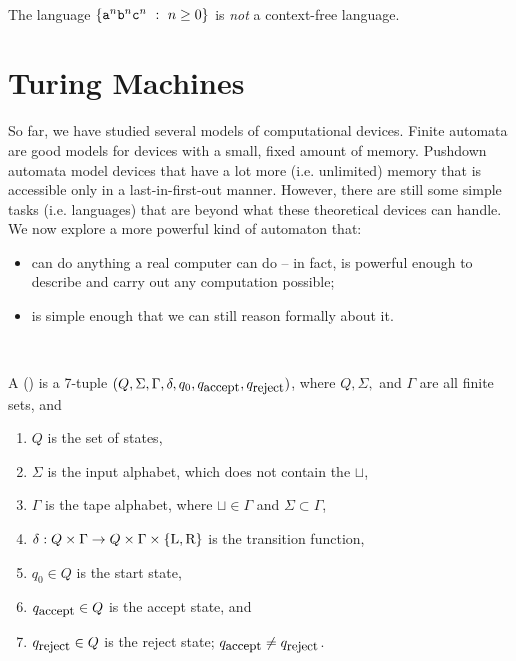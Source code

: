\documentclass[twoside,letterpaper,openany]{book}
\begin{document}
~

\begin{thm}
The language $\left\lbrace \texttt{a}^n \texttt{b}^n \texttt{c}^n\ :\  n \geq 0  \right\rbrace$ is \emph{not} a context-free language.
\end{thm}






\chapter{Turing Machines}

So far, we have studied several models of computational devices. Finite automata are good models for devices with a small, fixed amount of memory. Pushdown automata model devices that have a lot more (i.e. unlimited) memory that is accessible only in a last-in-first-out manner. However, there are still some simple tasks (i.e. languages) that are beyond what these theoretical devices can handle. We now explore a more powerful kind of automaton that:

\begin{itemize}
\item can do anything a real computer can do -- in fact, is powerful enough to describe and carry out any computation possible;
\item is simple enough that we can still reason formally about it.
\end{itemize}

~

\newcommand\qaccept{q_\textrm{\small accept}}
\newcommand\qreject{q_\textrm{\small reject}}
\newcommand\blanksymbol\sqcup
\newcommand\tmL{\textrm{L}}
\newcommand\tmR{\textrm{R}}
\newcommand\tmS{\textrm{S}}


\begin{defn}
A  () is a 7-tuple $(Q, \Sigma, \Gamma, \delta, q_0, \qaccept,\qreject )$, where $Q, \Sigma,$ and $\Gamma$ are all finite sets, and
\begin{enumerate}
\item $Q$ is the set of states,
\item $\Sigma$ is the input alphabet, which does not contain the  $\blanksymbol$,
\item $\Gamma$ is the tape alphabet, where $\blanksymbol \in \Gamma$ and $\Sigma \subset \Gamma$,
\item $\delta: Q \times \Gamma \rightarrow Q \times \Gamma \times \setdef{\tmL, \tmR}$ is the transition function,
\item $q_0 \in Q$ is the start state,
\item $\qaccept \in Q$ is the accept state, and
\item $\qreject \in Q$ is the reject state; $\qaccept \neq \qreject$.
\end{enumerate}
\end{defn}
\end{document}
